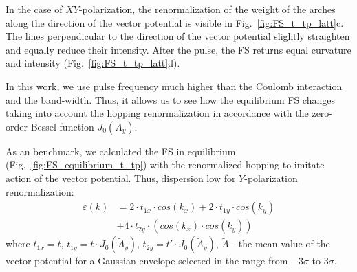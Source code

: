 In the case of $XY$-polarization, the renormalization of the weight of the arches along the direction of the vector potential is visible in Fig.~\ref{fig:FS_t_tp_latt}c. The lines perpendicular to the direction of the vector potential slightly straighten and equally reduce their intensity. After the pulse, the FS returns equal curvature and intensity (Fig.~\ref{fig:FS_t_tp_latt}d).

In this work, we use pulse frequency much higher than the Coulomb interaction and the band-width. Thus, it allows us to see how the equilibrium FS changes taking into account the hopping renormalization in accordance with the zero-order Bessel function $J_0(A_y)$.

As an benchmark, we calculated the FS in equilibrium (Fig.~\ref{fig:FS_equilibrium_t_tp}) with the renormalized hopping to imitate action of the vector potential. Thus, dispersion low for $Y$-polarization renormalization:
\begin{equation}
\begin{split}
 \varepsilon(k)&=2 \cdot t_{1x} \cdot cos(k_x)+2 \cdot t_{1y} \cdot cos(k_y)\\
 &+4 \cdot t_{2y} \cdot (cos(k_x)\cdot cos(k_y))
\end{split}
\label{dispersion_2}
\end{equation}
where $t_{1x}=t$, $t_{1y}=t \cdot J_0(\tilde{A}_y)$, $t_{2y}=t' \cdot J_0(\tilde{A}_y)$, $\tilde{A}$ - the mean value of the vector potential for a Gaussian envelope selected in the range from $-3 \sigma$ to $3 \sigma$.

